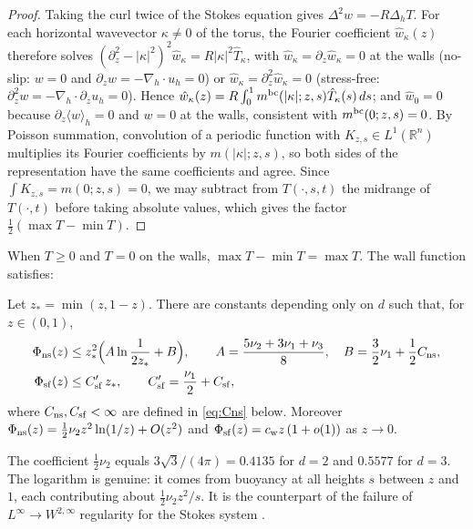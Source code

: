 \begin{proof}
Taking the curl twice of the Stokes equation gives $\Delta^2w=-R\Delta_hT$. For each horizontal wavevector
$\kappa\ne0$ of the torus, the Fourier coefficient $\hat w_\kappa(z)$ therefore solves
$(\partial_z^2-|\kappa|^2)^2\hat w_\kappa=R|\kappa|^2\hat T_\kappa$, with $\hat w_\kappa=\partial_z\hat w_\kappa=0$
at the walls (no-slip: $w=0$ and $\partial_zw=-\nabla_h\cdot u_h=0$) or $\hat w_\kappa=\partial_z^2\hat
w_\kappa=0$ (stress-free: $\partial_z^2w=-\nabla_h\cdot\partial_zu_h=0$). Hence
$\hat w_\kappa(z)=R\int_0^1m^{\rm bc}(|\kappa|;z,s)\hat T_\kappa(s)\,ds$; and $\hat w_0=0$ because
$\partial_z\langle w\rangle_h=0$ and $w=0$ at the walls, consistent with $m^{\rm bc}(0;z,s)=0$. By Poisson
summation, convolution of a periodic function with $K_{z,s}\in L^1(\mathbb R^n)$ multiplies its Fourier
coefficients by $m(|\kappa|;z,s)$, so both sides of the representation have the same coefficients and agree.
Since $\int K_{z,s}=m(0;z,s)=0$, we may subtract from $T(\cdot,s,t)$ the midrange of $T(\cdot,t)$ before
taking absolute values, which gives the factor $\tfrac12(\max T-\min T)$.
\end{proof}

When $T\ge0$ and $T=0$ on the walls, $\max T-\min T=\max T$. The wall function satisfies:

\begin{lemma}\label{lem:Phi}
Let $z_*=\min(z,1-z)$. There are constants depending only on $d$ such that, for $z\in(0,1)$,
\begin{align}
\Phi_{\rm ns}(z)&\le z_*^2\Big(A\ln\frac1{2z_*}+B\Big),\qquad A=\frac{5\nu_2+3\nu_1+\nu_3}{8},\quad
B=\frac32\nu_1+\frac12C_{\rm ns},\label{eq:Phins}\\
\Phi_{\rm sf}(z)&\le C'_{\rm sf}\,z_*,\qquad C'_{\rm sf}=\frac{\nu_1}2+C_{\rm sf},\label{eq:Phisf}
\end{align}
where $C_{\rm ns},C_{\rm sf}<\infty$ are defined in \eqref{eq:Cns} below. Moreover
$\Phi_{\rm ns}(z)=\tfrac12\nu_2z^2\ln(1/z)+O(z^2)$ and $\Phi_{\rm sf}(z)=c_{\rm w}z\,(1+o(1))$ as $z\to0$.
\end{lemma}

The coefficient $\tfrac12\nu_2$ equals $3\sqrt3/(4\pi)=0.4135$ for $d=2$ and $0.5577$ for $d=3$. The logarithm
is genuine: it comes from buoyancy at all heights $s$ between $z$ and $1$, each contributing about
$\tfrac12\nu_2z^2/s$. It is the counterpart of the failure of $L^\infty\to W^{2,\infty}$ regularity for the
Stokes system \citep{ConstantinDoering1999}.

